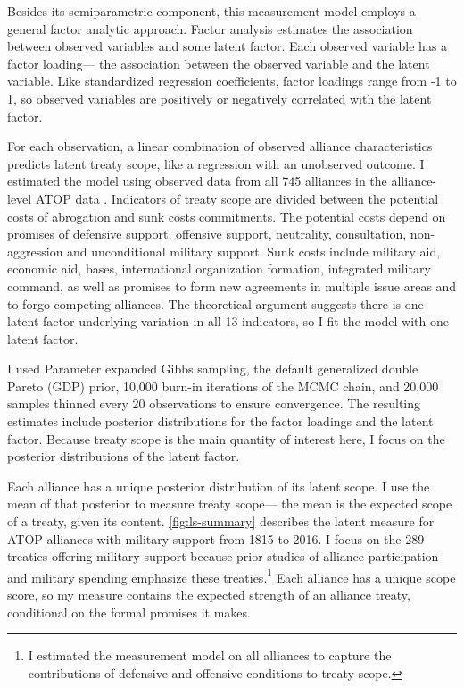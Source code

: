 \documentclass[12pt]{article}
\begin{document}
Besides its semiparametric component, this measurement model employs a general factor analytic approach.
Factor analysis estimates the association between observed variables and some latent factor.
Each observed variable has a factor loading--- the association between the observed variable and the latent variable.  
Like standardized regression coefficients, factor loadings range from -1 to 1, so observed variables are positively or negatively correlated with the latent factor.  


For each observation, a linear combination of observed alliance characteristics predicts latent treaty scope, like a regression with an unobserved outcome.  
I estimated the model using observed data from all 745 alliances in the alliance-level ATOP data \citep{Leedsetal2002}. 
Indicators of treaty scope are divided between the potential costs of abrogation and sunk costs commitments.
The potential costs depend on promises of defensive support, offensive support, neutrality, consultation, non-aggression and unconditional military support. 
Sunk costs include military aid, economic aid, bases, international organization formation, integrated military command, as well as promises to form new agreements in multiple issue areas and to forgo competing alliances. 
The theoretical argument suggests there is one latent factor underlying variation in all 13 indicators, so I fit the model with one latent factor. 


I used Parameter expanded Gibbs sampling, the default generalized double Pareto (GDP) prior, 10,000 burn-in iterations of the MCMC chain, and 20,000 samples thinned every 20 observations to ensure convergence. 
The resulting estimates include posterior distributions for the factor loadings and the latent factor. 
Because treaty scope is the main quantity of interest here, I focus on the posterior distributions of the latent factor. 


Each alliance has a unique posterior distribution of its latent scope. 
I use the mean of that posterior to measure treaty scope--- the mean is the expected scope of a treaty, given its content. 
\autoref{fig:ls-summary} describes the latent measure for ATOP alliances  with military support from 1815 to 2016.
I focus on the 289 treaties offering military support because prior studies of alliance participation and military spending emphasize these treaties.\footnote{
I estimated the measurement model on all alliances to capture the contributions of defensive and offensive conditions to treaty scope.}
Each alliance has a unique scope score, so my measure contains the expected strength of an alliance treaty, conditional on the formal promises it makes. 
\end{document}
